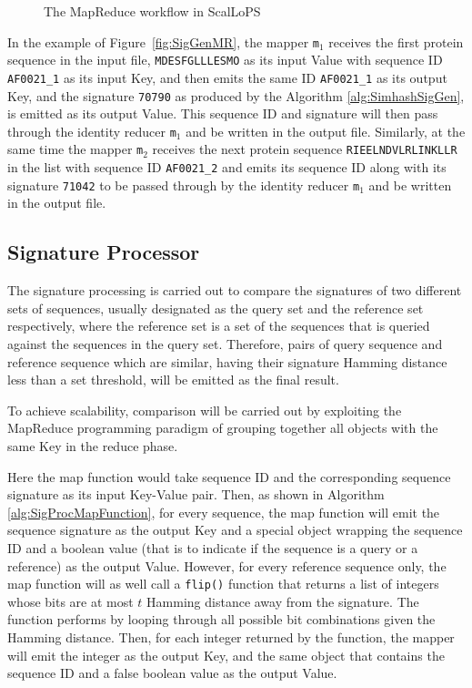 \documentclass[titlepage]{csetr}
\begin{document}
\begin{figure}[t]
   \centering
     \caption{The MapReduce workflow in ScalLoPS}  
\end{figure}

In the example of Figure~\ref{fig:SigGenMR}, the mapper \texttt{m$_{1}$} receives the first protein sequence in the input file, \texttt{MDESFGLLLESMO} as its input Value with sequence ID \texttt{AF0021\_1} as its input Key, and then emits the same ID \texttt{AF0021\_1} as its output Key, and the signature \texttt{70790} as produced by the Algorithm \ref{alg:SimhashSigGen}, is emitted as its output Value. This sequence ID and signature will then pass through the identity reducer \texttt{m$_{1}$} and be written in the output file. Similarly, at the same time the mapper \texttt{m$_{2}$} receives the next protein sequence \texttt{RIEELNDVLRLINKLLR} in the list with sequence ID \texttt{AF0021\_2} and emits its sequence ID along with its signature \texttt{71042} to be passed through by the identity reducer \texttt{m$_{1}$} and be written in the output file.

\subsection{Signature Processor}
The signature processing is carried out to compare the signatures of two different sets of sequences, usually designated as the query set and the reference set respectively, where the reference set is a set of the sequences that is queried against the sequences in the query set. Therefore, pairs of query sequence and reference sequence which are similar, having their signature Hamming distance less than a set threshold, will be emitted as the final result.

To achieve scalability, comparison will be carried out by exploiting the MapReduce programming paradigm of grouping together all objects with the same Key in the reduce phase.

Here the map function would take sequence ID and the corresponding sequence signature as its input Key-Value pair. Then, as shown in Algorithm \ref{alg:SigProcMapFunction}, for every sequence, the map function will emit the sequence signature as the output Key and a special object wrapping the sequence ID and a boolean value (that is to indicate if the sequence is a query or a reference) as the output Value. However, for every reference sequence only, the map function will as well call a \texttt{flip()} function that returns a list of integers whose bits are at most $t$ Hamming distance away from the signature. The function performs by looping through all possible bit combinations given the Hamming distance. Then, for each integer returned by the function, the mapper will emit the integer as the output Key, and the same object that contains the sequence ID and a false boolean value as the output Value. 
\end{document}
